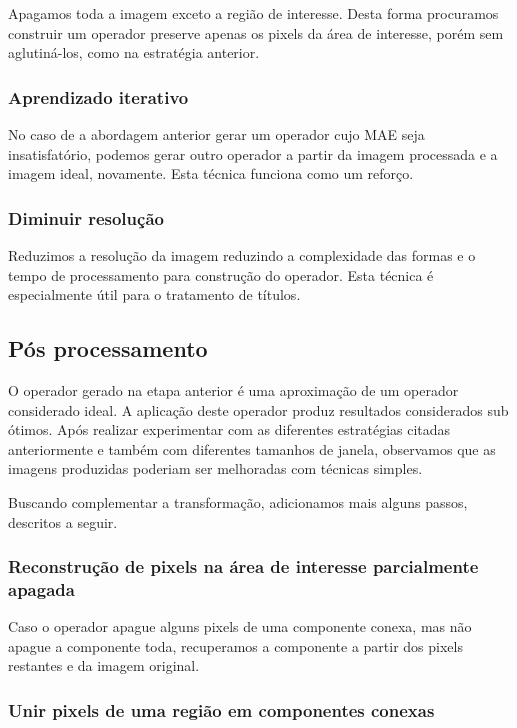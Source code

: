 \documentclass[a4paper,11pt]{article}
\begin{document}
        Apagamos toda a imagem exceto a região de interesse. Desta forma procuramos construir um operador preserve apenas os pixels da área de interesse, porém sem aglutiná-los, como na estratégia anterior.

      \subsubsection{Aprendizado iterativo}

        No caso de a abordagem anterior gerar um operador cujo MAE seja insatisfatório, podemos gerar outro operador a partir da imagem processada e a imagem ideal, novamente. Esta técnica funciona como um reforço.

      \subsubsection{Diminuir resolução}

        Reduzimos a resolução da imagem reduzindo a complexidade das formas e o tempo de processamento para construção do operador. Esta técnica é especialmente útil para o tratamento de títulos.

    \subsection{Pós processamento}

      O operador gerado na etapa anterior é uma aproximação de um operador considerado ideal. A aplicação deste operador produz resultados considerados sub ótimos. Após realizar experimentar com as diferentes estratégias citadas anteriormente e também com diferentes tamanhos de janela, observamos que as imagens produzidas poderiam ser melhoradas com técnicas simples.

      Buscando complementar a transformação, adicionamos mais alguns passos, descritos a seguir.

      \subsubsection{Reconstrução de pixels na área de interesse parcialmente apagada}

        Caso o operador apague alguns pixels de uma componente conexa, mas não apague a componente toda, recuperamos a componente a partir dos pixels restantes e da imagem original.

      \subsubsection{Unir pixels de uma região em componentes conexas}
\end{document}
